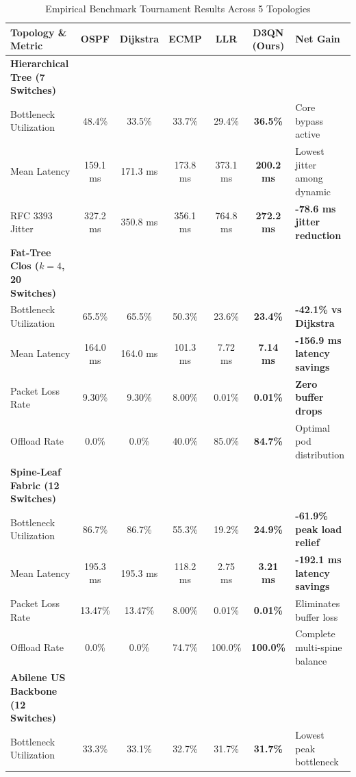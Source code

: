 \documentclass[11pt,a4paper]{article}
\begin{document}
\begin{table}[h]
\centering
\small
\caption{Empirical Benchmark Tournament Results Across 5 Topologies}
\label{tab:tournament}
\begin{tabularx}{\textwidth}{l c c c c c l}
\toprule
\textbf{Topology \& Metric} & \textbf{OSPF} & \textbf{Dijkstra} & \textbf{ECMP} & \textbf{LLR} & \textbf{D3QN (Ours)} & \textbf{Net Gain} \\
\midrule
\textbf{Hierarchical Tree (7 Switches)} & & & & & & \\
Bottleneck Utilization & 48.4\% & 33.5\% & 33.7\% & 29.4\% & \textbf{36.5\%} & Core bypass active \\
Mean Latency & 159.1 ms & 171.3 ms & 173.8 ms & 373.1 ms & \textbf{200.2 ms} & Lowest jitter among dynamic \\
RFC 3393 Jitter & 327.2 ms & 350.8 ms & 356.1 ms & 764.8 ms & \textbf{272.2 ms} & \textbf{-78.6 ms jitter reduction} \\
\midrule
\textbf{Fat-Tree Clos ($k=4$, 20 Switches)} & & & & & & \\
Bottleneck Utilization & 65.5\% & 65.5\% & 50.3\% & 23.6\% & \textbf{23.4\%} & \textbf{-42.1\% vs Dijkstra} \\
Mean Latency & 164.0 ms & 164.0 ms & 101.3 ms & 7.72 ms & \textbf{7.14 ms} & \textbf{-156.9 ms latency savings} \\
Packet Loss Rate & 9.30\% & 9.30\% & 8.00\% & 0.01\% & \textbf{0.01\%} & \textbf{Zero buffer drops} \\
Offload Rate & 0.0\% & 0.0\% & 40.0\% & 85.0\% & \textbf{84.7\%} & Optimal pod distribution \\
\midrule
\textbf{Spine-Leaf Fabric (12 Switches)} & & & & & & \\
Bottleneck Utilization & 86.7\% & 86.7\% & 55.3\% & 19.2\% & \textbf{24.9\%} & \textbf{-61.9\% peak load relief} \\
Mean Latency & 195.3 ms & 195.3 ms & 118.2 ms & 2.75 ms & \textbf{3.21 ms} & \textbf{-192.1 ms latency savings} \\
Packet Loss Rate & 13.47\% & 13.47\% & 8.00\% & 0.01\% & \textbf{0.01\%} & Eliminates buffer loss \\
Offload Rate & 0.0\% & 0.0\% & 74.7\% & 100.0\% & \textbf{100.0\%} & Complete multi-spine balance \\
\midrule
\textbf{Abilene US Backbone (12 Switches)} & & & & & & \\
Bottleneck Utilization & 33.3\% & 33.1\% & 32.7\% & 31.7\% & \textbf{31.7\%} & Lowest peak bottleneck \\

\end{tabularx}
\end{table}
\end{document}
